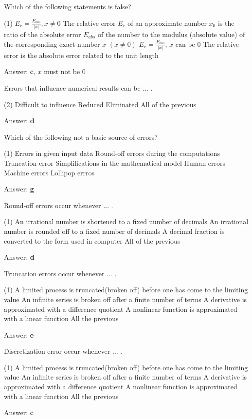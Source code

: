 \documentclass{exam}
\begin{document}
\begin{questions}
	\question Which of the following statements is false?
	\begin{tasks}(1)
		\task $E_r = \frac{E_{abs}}{|x|}, x \ne 0$
		\task The relative error $E_r$ of an approximate number $x_0$ is the ratio of the absolute error $E_{abs}$ of the number to the modulus (absolute value) of the corresponding exact number $x$ $(x \ne 0)$
		\task $E_r = \frac{E_{abs}}{|x|}$, $x$ can be 0
		\task The relative error is the absolute error related to the unit length
	\end{tasks}
	Answer: \textbf{c}, $x$ must not be $0$

	\question Errors that influence numerical results can be $\dots$ .
	\begin{tasks}(2)
		\task Difficult to influence
		\task Reduced
		\task Eliminated
		\task All of the previous
	\end{tasks}
	Answer: \textbf{d}

	\question Which of the following not a basic source of errors?
	\begin{tasks}(1)
		\task Errors in given input data
		\task Round-off errors during the computations
		\task Truncation error
		\task Simplifications in the mathematical model
		\task Human errors
		\task Machine errors
		\task Lollipop errros
	\end{tasks}
	Answer: \textbf{g}

	\question Round-off errors occur whenever $\dots$ .
	\begin{tasks}(1)
		\task An irrational number is shortened to a fixed number of decimals
		\task An irrational number is rounded off to a fixed number of decimals
		\task A decimal fraction is converted to the form used in computer
		\task All of the previous
	\end{tasks}
	Answer: \textbf{d}

	\question Truncation errors occur whenever $\dots$ .
	\begin{tasks}(1)
		\task A limited process is truncated(broken off) before one has come to the limiting value
		\task An infinite series is broken off after a finite number of terms
		\task A derivative is approximated with a difference quotient
		\task A nonlinear function is approximated with a linear function
		\task All the previous
	\end{tasks}
	Answer: \textbf{e}

	\question Discretization error occur whenever $\dots$ .
	\begin{tasks}(1)
		\task A limited process is truncated(broken off) before one has come to the limiting value
		\task An infinite series is broken off after a finite number of terms
		\task A derivative is approximated with a difference quotient
		\task A nonlinear function is approximated with a linear function
		\task All the previous
	\end{tasks}
	Answer: \textbf{c}


\end{questions}
\end{document}
